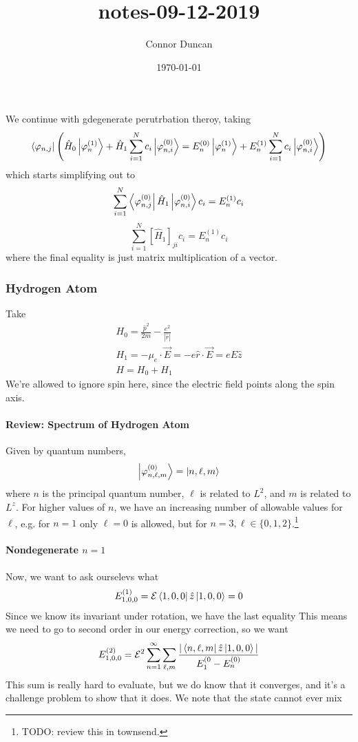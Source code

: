 \documentclass{article}
\author{Connor Duncan}
\date{\today}
\title{notes-09-12-2019}
\theoremstyle{definition}
\begin{document}
We continue with gdegenerate perutrbation theroy, taking \begin{equation} \bra{\varphi_{n,j}}\left(\hat H_0\ket{\varphi_n^{(1)}}+\hat H_1\sum_{i=1}^Nc_i\ket{\varphi_{n,i}^{(0)}} = E_n^{(0)}\ket{\varphi_n^{(1)}}+E_n^{(1)}\sum_{i=1}^Nc_i\ket{\varphi_{n,i}^{(0)}} \right) \end{equation} which starts simplifying out to \begin{equation} \sum_{i=1}^N \bra{\varphi_{n,j}^{(0)}}\hat H_1\ket{\varphi_{n,i}^{(0)}}c_i=E_n^{(1)}c_i \end{equation} \begin{equation} \sum_{i=1}^N\left[\hat H_1\right]_{ji}c_i=E_n^{(1)}c_i \end{equation} where the final equality is just matrix multiplication of a vector. \subsubsection{Hydrogen Atom} Take \begin{align} H_0=\frac{\hat p^2}{2m}-\frac{e^2}{|\hat r|} \\ H_1=-\mu_e\cdot\vec{E}=-e\hat r\cdot\vec{E}=eE\hat z \\ H=H_0+H_1 \end{align} We're allowed to ignore spin here, since the electric field points along the spin axis. \paragraph{Review: Spectrum of Hydrogen Atom} Given by quantum numbers, \begin{equation} \ket{\varphi^{(0)}_{n,\ell,m}}=\ket{n,\ell,m} \end{equation} where $n$ is the principal quantum number, $\ell$ is related to $L^2$, and $m$ is related to $L^z$. For higher values of $n$, we have an increasing number of allowable values for $\ell$, e.g. for $n=1$ only $\ell=0$ is allowed, but for $n=3,\ell\in\{0,1,2\}$.\footnote{TODO: review this in townsend.} \paragraph{Nondegenerate $n=1$} Now, we want to ask ourselevs what \begin{equation} E_{1,0,0}^{(1)}=\mathcal E\bra{1,0,0}\hat z\ket{1,0,0}=0 \end{equation} Since we know its invariant under rotation, we have the last equality This means we need to go to second order in our energy correction, so we want \begin{equation} E_{1,0,0}^{(2)}=\mathcal E^2\sum_{n=1}^{\infty}\sum_{\ell,m} \frac{|\bra{n,\ell,m}\hat z\ket{1,0,0}|}{E_1^{(0}-E_n^{(0)}} \end{equation} This sum is really hard to evaluate, but we do know that it converges, and it's a challenge problem to show that it does. We note that the state cannot ever mix 
\end{document}
